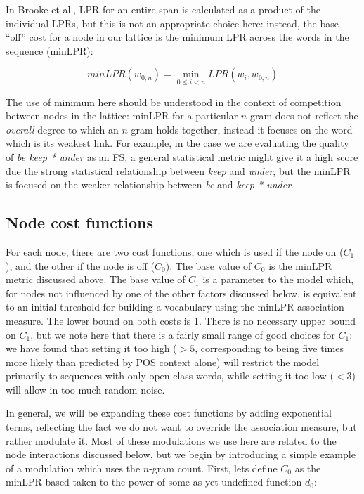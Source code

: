 \documentclass[11pt]{article}
\makeatletter
\def \al {al.\@ }
\makeatother
\begin{document}
In Brooke et \al {}, LPR for an entire span is calculated as a product of the individual LPRs, but this is not an appropriate choice here: instead, the base ``off'' cost for a node in our lattice is the minimum LPR across the words in the sequence (minLPR):

\begin{displaymath}
minLPR(w_{0,n}) = \min_{0 \leq i < n }{LPR(w_i,w_{0,n})}
\end{displaymath}

The use of minimum here should be understood in the context of competition between nodes in the lattice: minLPR for a particular $n$-gram does not reflect the \emph{overall}
degree to which an $n$-gram holds together, instead it focuses on the word which is its weakest link. For example, in the case we are evaluating the quality of \emph{be keep * under} as an FS, a general statistical metric might give it a high score due the strong statistical relationship between \emph{keep} and \emph{under}, but the minLPR is focused on the weaker relationship between \emph{be} and \emph{keep * under}.


\subsection{Node cost functions}

For each node, there are two cost functions, one which is used if the node on ($C_{1}$), and the other if the node is off ($C_{0}$). The base value of $C_{0}$ is the minLPR metric discussed above. The base value of $C_{1}$ is a parameter to the model which, for nodes not influenced by one of the other factors discussed below, is equivalent to an initial threshold for building a vocabulary using the minLPR association measure. The lower bound on both costs is 1. There is no necessary upper bound on $C_{1}$, but we note here that there is a fairly small range of good choices for $C_{1}$; we have found that setting it too high ($>5$, corresponding to being five times more likely than predicted by POS context alone) will restrict the model primarily to sequences with only open-class words, while setting it too low ($<3$) will allow in too much random noise.

In general, we will be expanding these cost functions by adding exponential terms, reflecting the fact we do not want to override the association measure, but rather modulate it. Most of these modulations we use here are related to the node interactions discussed below, but we begin by introducing a simple example of a modulation which uses the $n$-gram count. First, lets define $C_0$ as the minLPR based taken to the power of some as yet undefined function $d_0$:
\end{document}
